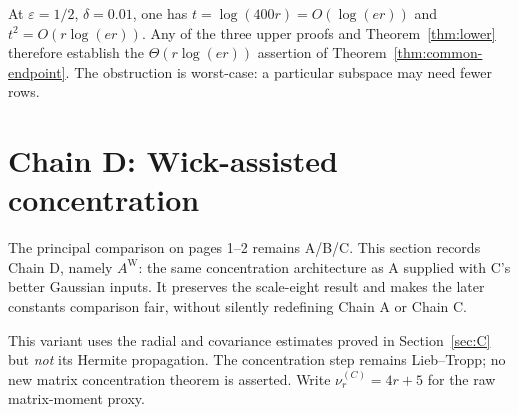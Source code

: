 \documentclass[11pt]{article}
\numberwithin{equation}{section}
\theoremstyle{definition}\newtheorem{definition}[theorem]{Definition}
\theoremstyle{remark}\newtheorem{remark}[theorem]{Remark}
\begin{document}
At $\varepsilon=1/2$, $\delta=0.01$, one has
$t=\log(400r)=O(\log(er))$ and $t^2=O(r\log(er))$.
Any of the three upper proofs and Theorem~\ref{thm:lower} therefore establish the
$\Theta(r\log(er))$ assertion of Theorem~\ref{thm:common-endpoint}.
The obstruction is worst-case: a particular subspace may need fewer rows.

\clearpage
\clearpage
\section{Chain D: Wick-assisted concentration}\label{sec:D}
\begin{takeaway}[title={A separate fourth section using the Wick input inside concentration}]
The principal comparison on pages 1--2 remains A/B/C. This section records
Chain D, namely $A^{\mathrm W}$: the same concentration architecture as A supplied with C's
better Gaussian inputs. It preserves the scale-eight result and makes the later
constants comparison fair, without silently redefining Chain A or Chain C.
\end{takeaway}

This variant uses the radial and covariance estimates proved in
Section~\ref{sec:C} but \emph{not} its Hermite propagation. The concentration
step remains Lieb--Tropp; no new matrix concentration theorem is asserted.
Write $\nu_r^{(C)}=4r+5$ for the raw matrix-moment proxy.
\end{document}
